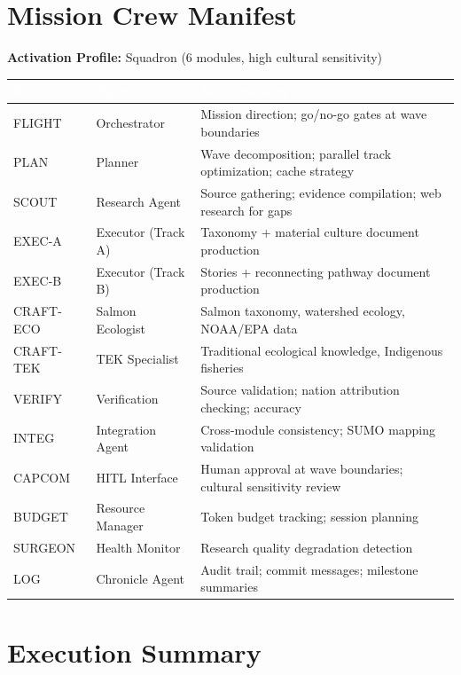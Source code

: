 \documentclass[11pt,letterpaper]{article}
\newcommand{\tableheader}[1]{\textbf{\sffamily\textcolor{white}{#1}}}
\begin{document}
\section{Mission Crew Manifest}

\textbf{Activation Profile:} Squadron (6 modules, high cultural sensitivity)

\begin{center}
\begin{tabularx}{\textwidth}{L{2cm}L{3cm}X}
\toprule
{}
\tableheader{Role} & \tableheader{Agent} & \tableheader{Responsibility} \\
\midrule
FLIGHT & Orchestrator & Mission direction; go/no-go gates at wave boundaries \\
PLAN & Planner & Wave decomposition; parallel track optimization; cache strategy \\
SCOUT & Research Agent & Source gathering; evidence compilation; web research for gaps \\
EXEC-A & Executor (Track A) & Taxonomy + material culture document production \\
EXEC-B & Executor (Track B) & Stories + reconnecting pathway document production \\
CRAFT-ECO & Salmon Ecologist & Salmon taxonomy, watershed ecology, NOAA/EPA data \\
CRAFT-TEK & TEK Specialist & Traditional ecological knowledge, Indigenous fisheries \\
VERIFY & Verification & Source validation; nation attribution checking; accuracy \\
INTEG & Integration Agent & Cross-module consistency; SUMO mapping validation \\
CAPCOM & HITL Interface & Human approval at wave boundaries; cultural sensitivity review \\
BUDGET & Resource Manager & Token budget tracking; session planning \\
SURGEON & Health Monitor & Research quality degradation detection \\
LOG & Chronicle Agent & Audit trail; commit messages; milestone summaries \\
\bottomrule
\end{tabularx}
\end{center}

\section{Execution Summary}
\end{document}

